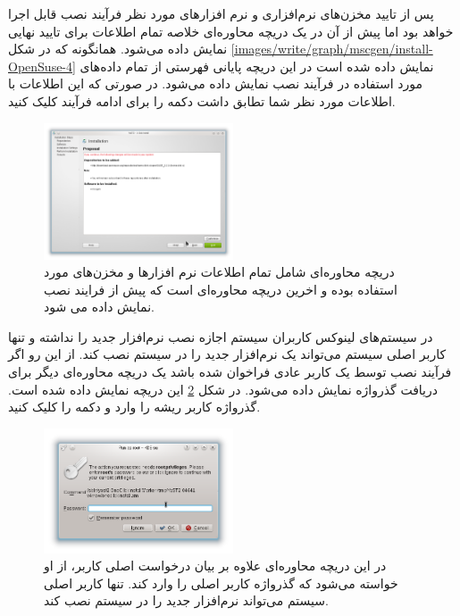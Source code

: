 پس از تایید مخزن‌های نرم‌افزاری و نرم افزارهای مورد نظر فرآیند نصب قابل اجرا
خواهد بود اما پیش از آن در یک دریچه محاوره‌ای خلاصه تمام اطلاعات برای تایید
نهایی نمایش داده می‌شود. همانگونه که در شکل \ref{images/write/graph/mscgen/install-OpenSuse-4}
نمایش داده شده است در این دریچه پایانی فهرستی از تمام داده‌های مورد استفاده در
فرآیند نصب نمایش داده می‌شود. در صورتی که این اطلاعات با اطلاعات مورد نظر شما
تطابق داشت دکمه  را برای ادامه فرآیند کلیک کنید.

\begin{figure}
	\centering
	\includegraphics[width=0.5\textwidth]{image/write/graph/mscgen/install-OpenSuse-4}
	\caption[اطلاعات کلی فرآیند نصب نرم‌افزار ]{
		دریچه محاوره‌ای شامل تمام اطلاعات نرم افزارها و مخزن‌های مورد استفاده بوده و
		اخرین دریچه محاوره‌ای است که پیش از فرایند نصب نمایش داده می شود.
	}
	\label{image/write/graph/mscgen/install-OpenSuse-4}
\end{figure}

در سیستم‌های لینوکس کاربران سیستم اجازه نصب نرم‌افزار جدید را نداشته و تنها
کاربر اصلی سیستم می‌تواند یک نرم‌افزار جدید را در سیستم نصب کند. از این رو
اگر فرآیند نصب توسط یک کاربر عادی فراخوان شده باشد یک دریچه محاوره‌ای دیگر برای
دریافت گذرواژه نمایش داده می‌شود. در شکل
\ref{image/write/graph/mscgen/install-OpenSuse-5} این دریچه نمایش داده شده
است. گذرواژه کاربر ریشه را وارد و دکمه  را کلیک کنید.

\begin{figure}
	\centering
	\includegraphics[width=0.5\textwidth]{image/write/graph/mscgen/install-OpenSuse-5}
	\caption[احراز اصالت برای نصب نرم‌افزار ]{
		در این دریچه محاوره‌ای علاوه بر بیان درخواست اصلی کاربر، از او خواسته می‌شود
		که گذرواژه کاربر اصلی را وارد کند. تنها کاربر اصلی سیستم می‌تواند نرم‌افزار
		جدید را در سیستم نصب کند.
	}
	\label{image/write/graph/mscgen/install-OpenSuse-5}
\end{figure}

